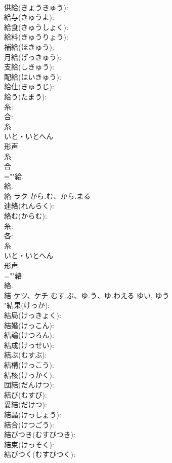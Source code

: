 \documentclass[8pt]{extreport}
\begin{document}
\begin{CJK}{UTF8}{min}
\\	供給(きょうきゅう): 
\\	給与(きゅうよ): 
\\	給食(きゅうしょく): 
\\	給料(きゅうりょう): 
\\	補給(ほきゅう): 
\\	月給(げっきゅう): 
\\	支給(しきゅう): 
\\	配給(はいきゅう): 
\\	給仕(きゅうじ): 
\\	給う(たまう): 
\\	糸: 
\\	合: 
\\	糸	
\\	いと・いとへん	
\\	形声 
\\	糸 
\\	合 
\\	=""給.
\\	給.
\\	絡	ラク	から.む、から.まる		
\\	連絡(れんらく): 
\\	絡む(からむ): 
\\	糸: 
\\	各: 
\\	糸	
\\	いと・いとへん	
\\	形声 
\\	=""絡.
\\	絡.
\\	結	ケツ、ケチ	むす.ぶ、ゆ.う、ゆ.わえる	ゆい, ゆう	
\\	"結果(けっか): 
\\	結局(けっきょく): 
\\	結婚(けっこん): 
\\	結論(けつろん): 
\\	結成(けっせい): 
\\	結ぶ(むすぶ): 
\\	結構(けっこう): 
\\	結核(けっかく): 
\\	団結(だんけつ): 
\\	結び(むすび): 
\\	妥結(だけつ): 
\\	結晶(けっしょう): 
\\	結合(けつごう): 
\\	結びつき(むすびつき): 
\\	結束(けっそく): 
\\	結びつく(むすびつく): 

\end{CJK}
\end{document}
